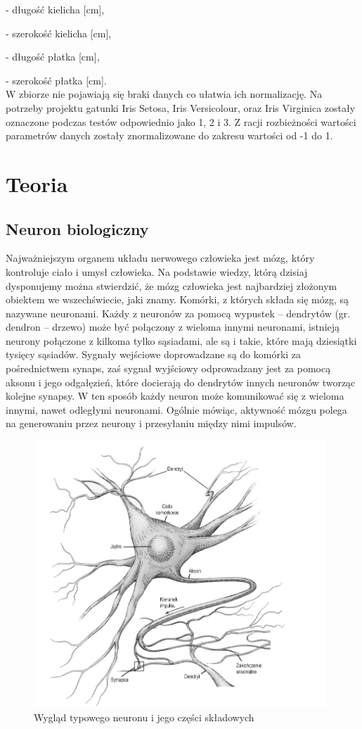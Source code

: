 \documentclass[a4paper, 12pt]{report}
\begin{document}
- długość kielicha [cm],

- szerokość kielicha [cm],

- długość płatka [cm],

- szerokość płatka [cm].\\



W zbiorze nie pojawiają się braki danych co ułatwia ich normalizację. Na potrzeby projektu gatunki Iris Setosa, Iris Versicolour, oraz Iris Virginica zostały oznaczone podczas testów odpowiednio jako 1, 2 i 3. Z racji rozbieżności wartości parametrów danych zostały znormalizowane do zakresu wartości od -1 do 1.

\chapter{Teoria}

\section{Neuron biologiczny}
Najważniejszym organem układu nerwowego człowieka jest mózg, który kontroluje ciało i umysł człowieka. Na podstawie wiedzy, którą dzisiaj dysponujemy można stwierdzić, że mózg
człowieka jest najbardziej złożonym obiektem we wszechświecie, jaki znamy. Komórki, z których składa się mózg, są nazywane neuronami. Każdy z neuronów za pomocą wypustek – dendrytów (gr. dendron – drzewo) może być połączony z wieloma innymi neuronami, istnieją neurony połączone z kilkoma tylko sąsiadami, ale są i takie, które mają dziesiątki tysięcy sąsiadów. Sygnały wejściowe doprowadzane są do komórki za pośrednictwem synaps, zaś sygnał wyjściowy odprowadzany jest za pomocą aksonu i jego odgałęzień, które docierają do dendrytów innych neuronów tworząc kolejne synapsy. W ten sposób każdy neuron może komunikować się z wieloma innymi, nawet odległymi neuronami. Ogólnie mówiąc, aktywność mózgu polega na generowaniu przez neurony i przesyłaniu między nimi impulsów.

\begin{figure}[hbt!]
\includegraphics[width=11cm]{naturalny_neuron}
\centering
\caption{Wygląd typowego neuronu i jego części składowych\cite {book5}}
\end{figure}
\end{document}

